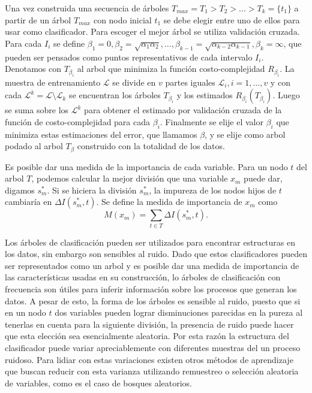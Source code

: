 \documentclass[letterpaper,12pt]{book}
\begin{document}
Una vez construida una secuencia de árboles $T_{max} = T_1>T_2>\dots>T_{k}=\{t_1\}$  a partir de un árbol $T_{max}$ con nodo inicial $t_1$ se debe elegir entre uno de ellos para usar como clasificador. Para escoger el mejor árbol se utiliza validación cruzada.  Para cada $I_i$ se define $\beta_1 = 0, \beta_2 = \sqrt{\alpha_1\alpha_2},\dots, \beta_{k-1} = \sqrt{\alpha_{k-2}\alpha_{k-1}},\beta_{k} = \infty$, que pueden ser pensados como puntos representativos de cada intervalo $I_i$. Denotamos con $T_{\beta_{i}}$ al arbol que minimiza la función costo-complejidad $R_{\beta_i}$.  La muestra de entrenamiento $\mathcal{L}$ se divide en $v$ partes iguales $\mathcal{L}_i,i=1,\dots,v$ y con cada $\mathcal{L}^k = \mathcal{L}\setminus \mathcal{L}_k$ se encuentran los árboles $T_{\beta_i}$ y los estimados $R_{\beta_i}(T_{\beta_i})$. Luego se suma sobre los $\mathcal{L}^k$ para obtener el estimado por validación cruzada de la función de costo-complejidad para cada $\beta_{i}$. Finalmente se elije el valor $\beta_i$ que minimiza estas estimaciones del error, que llamamos $\beta$, y se elije como arbol podado al  arbol $T_{\beta}$ construido con la totalidad de los datos.

Es posible dar una medida de la importancia de cada variable. Para un nodo $t$ del arbol $T$, podemos calcular la mejor división que una variable $x_m$ puede dar, digamos $s_m^*$. Si se hiciera la división $s_m^*$, la impureza de los nodos hijos de $t$ cambiaría en $\Delta I(s^*_m,t)$. Se define la medida de importancia de $x_m$ como 
\begin{equation}
M(x_m) =\sum_{t\in T} \Delta I(s^*_m,t).
\end{equation} 
 
Los árboles de clasificación pueden ser utilizados para encontrar estructuras en los datos, sin embargo son sensibles al ruido. Dado que estos clasificadores pueden ser representados como un arbol y es posible dar una medida de importancia de las características usadas en su construcción, lo árboles de clasificación con frecuencia son útiles para inferir información sobre los procesos que generan los datos. A pesar de esto, la forma de los árboles es sensible al ruido, puesto que si en un nodo $t$ dos variables pueden lograr disminuciones parecidas en la pureza al tenerlas en cuenta para la siguiente división, la presencia de ruido puede hacer que esta elección sea esencialmente aleatoria. Por esta razón la estructura del clasificador puede variar apreciablemente con diferentes muestras del un proceso ruidoso. Para lidiar con estas variaciones existen otros métodos de aprendizaje que buscan reducir con esta varianza utilizando remuestreo o selección aleatoria de variables, como es el caso de bosques aleatorios.
\end{document}
